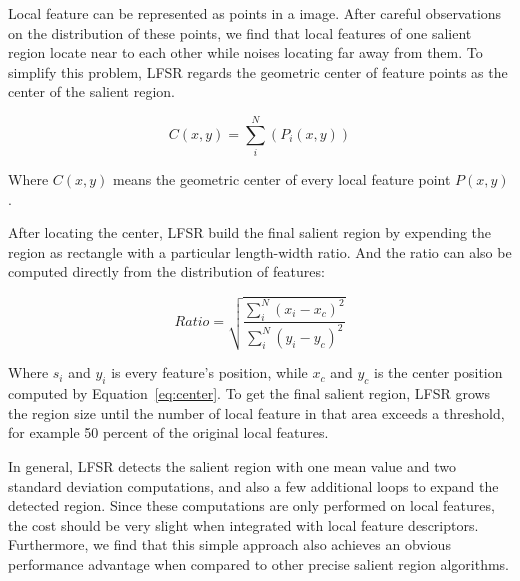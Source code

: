 Local feature can be represented as points in a image. After careful observations on the distribution of these points, we find that local features of one salient region locate near to each other while noises locating far away from them. To simplify this problem, LFSR regards the geometric center of feature points as the center of the salient region.

{\begin{equation} \label{eq:center}
C(x, y) = \sum_{i}^{N}\left({P}_{i}(x, y) \right)
\end{equation}}

Where $C(x, y)$ means the geometric center of every local feature point $P(x, y)$.

After locating the center, LFSR build the final salient region by expending the region as rectangle with a particular length-width ratio. And the ratio can also be computed directly from the distribution of features:

{\begin{equation} \label{eq:ratio}
Ratio = \sqrt{\frac{\sum_{i}^{N}\left ( x_{i}-x_{c} \right )^{2}}{\sum_{i}^{N}\left ( y_{i}-y_{c} \right )^{2}}}
\end{equation}}

Where $s_{i}$ and $y_{i}$ is every feature's position, while $x_{c}$ and $y_{c}$ is the center position computed by Equation~\ref{eq:center}. To get the final salient region, LFSR grows the region size until the number of local feature in that area exceeds a threshold, for example 50 percent of the original local features.

In general, LFSR detects the salient region with one mean value and two standard deviation computations, and also a few additional loops to expand the detected region. Since these computations are only performed on local features, the cost should be very slight when integrated with local feature descriptors. Furthermore, we find that this simple approach also achieves an obvious performance advantage when compared to other precise salient region algorithms.